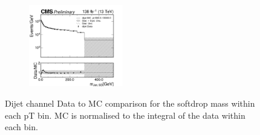 \begin{figure}[h!]
\begin{subfigure}
  \end{subfigure}
  \begin{subfigure}
    \centering
    \includegraphics[width=0.45\textwidth]{figures/multijet/dijet/dijet_msd_680_13000.png}
  \end{subfigure}
  \caption{Dijet channel  Data to MC comparison for the softdrop mass within each pT bin. MC is normalised to the integral of the data within each \pt bin.}
  \label{fig:18}
\end{figure}

